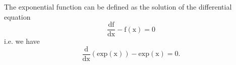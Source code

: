 The exponential function can be defined as the solution of the differential
equation 
\[ \frac{\mathrm{df}}{\mathrm{dx}} - \mathrm{f(x)} = 0 \]
i.e. we have \[ \frac{\mathrm{d}}{\mathrm{dx}} ( \mathrm{exp(x)} ) - \mathrm{exp(x)} = 0 . \]